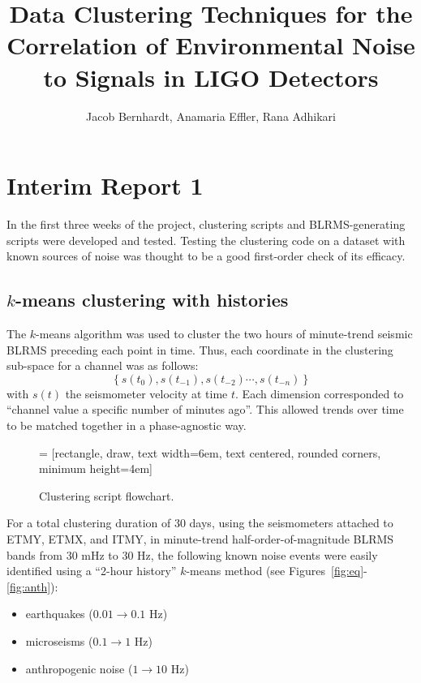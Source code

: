 \documentclass[colorlinks=true,pdfstartview=FitV,linkcolor=blue,
            citecolor=red,urlcolor=magenta]{ligodoc}
\title{Data Clustering Techniques for the Correlation of Environmental Noise to Signals in LIGO Detectors}
\author{Jacob Bernhardt, Anamaria Effler, Rana Adhikari}
\begin{document}


\section{Interim Report 1}

In the first three weeks of the project, clustering scripts and BLRMS-generating scripts were developed and tested.
Testing the clustering code on a dataset with known sources of noise was thought to be a good first-order check of its efficacy.

\subsection{$k$-means clustering with histories}
The $k$-means algorithm was used to cluster the two hours of minute-trend seismic BLRMS preceding each point in time.
Thus, each coordinate in the clustering sub-space for a channel was as follows:
\begin{equation}
  \left\{s(t_0),s(t_{-1}),s(t_{-2})\cdots,s(t_{-n})\right\}
\end{equation}
with $s(t)$ the seismometer velocity at time $t$.
Each dimension corresponded to ``channel value a specific number of minutes ago''.
This allowed trends over time to be matched together in a phase-agnostic way.

\begin{figure}[h]
   = [rectangle, draw, text width=6em, text centered, rounded corners, minimum height=4em]
  \caption{Clustering script flowchart.}
\end{figure}

For a total clustering duration of 30 days, using the seismometers attached to ETMY, ETMX, and ITMY, in minute-trend half-order-of-magnitude BLRMS bands from 30 mHz to 30 Hz, the following known noise events were easily identified using a ``2-hour history'' $k$-means method (see Figures~\ref{fig:eq}-\ref{fig:anth}):
\begin{itemize}
\item earthquakes ($0.01\to0.1$ Hz)
\item microseisms ($0.1\to1$ Hz)
\item anthropogenic noise ($1\to10$ Hz)
\end{itemize}
\end{document}
